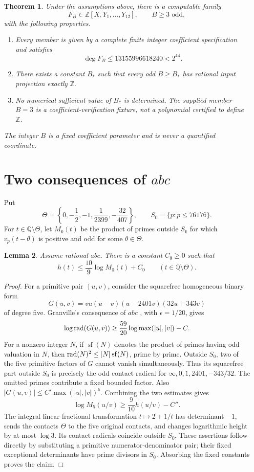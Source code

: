 \documentclass[11pt,a4paper]{article}
\newtheorem{theorem}{Theorem}[section]
\newtheorem{lemma}[theorem]{Lemma}
\newcommand{\Q}{\mathbb Q}\newcommand{\Z}{\mathbb Z}
\begin{document}
\begin{theorem}\label{thm:main}
Under the assumptions above, there is a computable family
\[
 F_B\in\Z[X,Y_1,\ldots,Y_{12}],\qquad B\ge3\text{ odd},
\]
with the following properties.
\begin{enumerate}
\item Every member is given by a complete finite integer coefficient
specification and satisfies
\[
             \deg F_B\le13155996618240<2^{44}.
\]
\item There exists a constant $B_*$ such that every odd $B\ge B_*$
has rational input projection exactly $\Z$.
\item No numerical sufficient value of $B_*$ is determined.
The supplied member $B=3$ is a coefficient-verification fixture,
not a polynomial certified to define $\Z$.
\end{enumerate}
The integer $B$ is a fixed coefficient parameter and is never a
quantified coordinate.
\end{theorem}

\section{Two consequences of $abc$}

Put
\[
 \Theta=\left\{0,-\frac12,-1,\frac1{2399},-\frac{32}{407}\right\},
 \qquad S_0=\{p:p\le76176\}.
\]
For $t\in\Q\setminus\Theta$, let $M_0(t)$ be the product of
primes outside $S_0$ for which $v_p(t-\theta)$ is positive
and odd for some $\theta\in\Theta$.

\begin{lemma}\label{lem:contact}
Assume rational $abc$. There is a constant $C_0\ge0$ such that
\[
                    h(t)\le\frac{10}{9}\log M_0(t)+C_0
                  \qquad(t\in\Q\setminus\Theta).
\]
\end{lemma}
\begin{proof}
For a primitive pair $(u,v)$, consider the squarefree homogeneous
binary form
\[
 G(u,v)=vu(u-v)(u-2401v)(32u+343v)
\]
of degree five. Granville's consequence of $abc$
\cite[Proposition~1]{Granville}, with $\epsilon=1/20$, gives
\[
 \log\operatorname{rad}(G(u,v))\ge\frac{59}{20}\log\max(|u|,|v|)-C.
\]
For a nonzero integer $N$, if $\operatorname{sf}(N)$ denotes
the product of primes having odd valuation in $N$, then
$\operatorname{rad}(N)^2\le |N|\operatorname{sf}(N)$, prime by prime.
Outside $S_0$, two of the five primitive factors of $G$ cannot
vanish simultaneously. Thus its squarefree part outside $S_0$
is precisely the odd contact radical for
$\infty,0,1,2401,-343/32$. The omitted primes contribute a fixed
bounded factor. Also $|G(u,v)|\le C'\max(|u|,|v|)^5$.
Combining the two estimates gives
\[
 \log M_5(u/v)\ge\frac9{10}h(u/v)-C''.
\]
The integral linear fractional transformation $t\mapsto2+1/t$
has determinant $-1$, sends the contacts $\Theta$ to the five
original contacts, and changes logarithmic height by at most
$\log3$. Its contact radicals coincide outside $S_0$.
These assertions follow directly by substituting a primitive
numerator-denominator pair; their fixed exceptional determinants
have prime divisors in $S_0$. Absorbing the fixed constants proves
the claim.
\end{proof}
\end{document}
